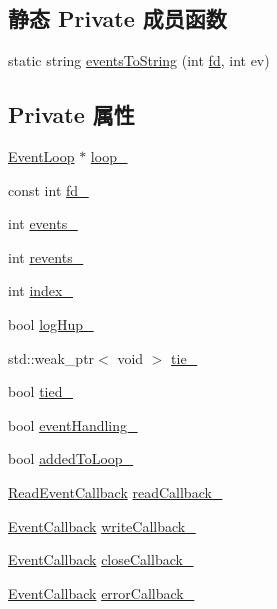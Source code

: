 \subsection*{静态 Private 成员函数}
\begin{DoxyCompactItemize}
\item 
static string \hyperlink{classmuduo_1_1net_1_1Channel_a19a941214946dc266246c0050bb68636}{events\+To\+String} (int \hyperlink{classmuduo_1_1net_1_1Channel_ace5c4071ee8893901bb818bbcab739b2}{fd}, int ev)
\end{DoxyCompactItemize}
\subsection*{Private 属性}
\begin{DoxyCompactItemize}
\item 
\hyperlink{classmuduo_1_1net_1_1EventLoop}{Event\+Loop} $\ast$ \hyperlink{classmuduo_1_1net_1_1Channel_a19968f50018d32ac31f5cba0195591ac}{loop\+\_\+}
\item 
const int \hyperlink{classmuduo_1_1net_1_1Channel_a09562e53209b1f330f5139f6eccce269}{fd\+\_\+}
\item 
int \hyperlink{classmuduo_1_1net_1_1Channel_a42e49f2f857ee5a1a8e3d7dead16e988}{events\+\_\+}
\item 
int \hyperlink{classmuduo_1_1net_1_1Channel_a57a0ca4614e5a2696d0dc1ca7e6cc72d}{revents\+\_\+}
\item 
int \hyperlink{classmuduo_1_1net_1_1Channel_aaaf1ac02dfa554a3cdffc647d512a77b}{index\+\_\+}
\item 
bool \hyperlink{classmuduo_1_1net_1_1Channel_a237db9b6d0cf4e35a5c59529c0ef93fd}{log\+Hup\+\_\+}
\item 
std\+::weak\+\_\+ptr$<$ void $>$ \hyperlink{classmuduo_1_1net_1_1Channel_adfadf3e2323379cf69f657560c11e2c0}{tie\+\_\+}
\item 
bool \hyperlink{classmuduo_1_1net_1_1Channel_a9284761be34be1dc23584163736830fa}{tied\+\_\+}
\item 
bool \hyperlink{classmuduo_1_1net_1_1Channel_adde382716a55887e3b6e9cec9d615380}{event\+Handling\+\_\+}
\item 
bool \hyperlink{classmuduo_1_1net_1_1Channel_aaff5c3b39bd429a98945d94040bb828f}{added\+To\+Loop\+\_\+}
\item 
\hyperlink{classmuduo_1_1net_1_1Channel_ae78e1c2582cc5d60cd1a4506851e8991}{Read\+Event\+Callback} \hyperlink{classmuduo_1_1net_1_1Channel_a48142903e7199fc704ef449f4a7c75ee}{read\+Callback\+\_\+}
\item 
\hyperlink{classmuduo_1_1net_1_1Channel_aefcb94d55a02528f90f3aa028191dcb2}{Event\+Callback} \hyperlink{classmuduo_1_1net_1_1Channel_a1d5ee91b83f4499ea0a52c5491113169}{write\+Callback\+\_\+}
\item 
\hyperlink{classmuduo_1_1net_1_1Channel_aefcb94d55a02528f90f3aa028191dcb2}{Event\+Callback} \hyperlink{classmuduo_1_1net_1_1Channel_a97e25dcb601312c3c9b94e4cfa56865c}{close\+Callback\+\_\+}
\item 
\hyperlink{classmuduo_1_1net_1_1Channel_aefcb94d55a02528f90f3aa028191dcb2}{Event\+Callback} \hyperlink{classmuduo_1_1net_1_1Channel_a8790ab985c8b1ca29f4eed435635b4b0}{error\+Callback\+\_\+}
\end{DoxyCompactItemize}
